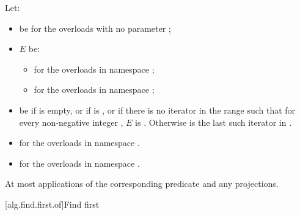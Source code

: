 \begin{itemdescr}
\pnum
Let:
\begin{itemize}
\item
   be 
  for the overloads with no parameter ;
\item
  $E$ be:
  \begin{itemize}
  \item
    for the overloads in namespace ;
  \item
    for the overloads in namespace ;
  \end{itemize}
\item
   be  if  is empty,
  or if  is ,
  or if there is no iterator
  in the range 
  such that for every non-negative integer
  , $E$ is .
  Otherwise  is the last such iterator
  in .
\end{itemize}

\pnum
\returns
\begin{itemize}
\item {} for the overloads in namespace .
\item {}
  for the overloads in namespace .
\end{itemize}

\pnum
\complexity
At most
applications of the corresponding predicate and any projections.
\end{itemdescr}

[alg.find.first.of]{Find first}

